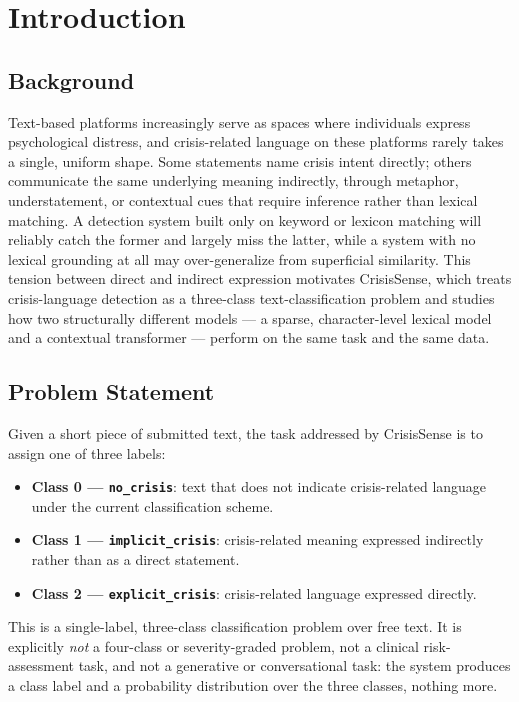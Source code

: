 \chapter{Introduction}

\section{Background}

Text-based platforms increasingly serve as spaces where individuals express psychological distress, and crisis-related language on these platforms rarely takes a single, uniform shape. Some statements name crisis intent directly; others communicate the same underlying meaning indirectly, through metaphor, understatement, or contextual cues that require inference rather than lexical matching. A detection system built only on keyword or lexicon matching will reliably catch the former and largely miss the latter, while a system with no lexical grounding at all may over-generalize from superficial similarity. This tension between direct and indirect expression motivates CrisisSense, which treats crisis-language detection as a three-class text-classification problem and studies how two structurally different models --- a sparse, character-level lexical model and a contextual transformer --- perform on the same task and the same data.

\section{Problem Statement}

Given a short piece of submitted text, the task addressed by CrisisSense is to assign one of three labels:

\begin{itemize}[nosep]
  \item \textbf{Class 0 --- \texttt{no\_crisis}}: text that does not indicate crisis-related language under the current classification scheme.
  \item \textbf{Class 1 --- \texttt{implicit\_crisis}}: crisis-related meaning expressed indirectly rather than as a direct statement.
  \item \textbf{Class 2 --- \texttt{explicit\_crisis}}: crisis-related language expressed directly.
\end{itemize}

This is a single-label, three-class classification problem over free text. It is explicitly \emph{not} a four-class or severity-graded problem, not a clinical risk-assessment task, and not a generative or conversational task: the system produces a class label and a probability distribution over the three classes, nothing more.


